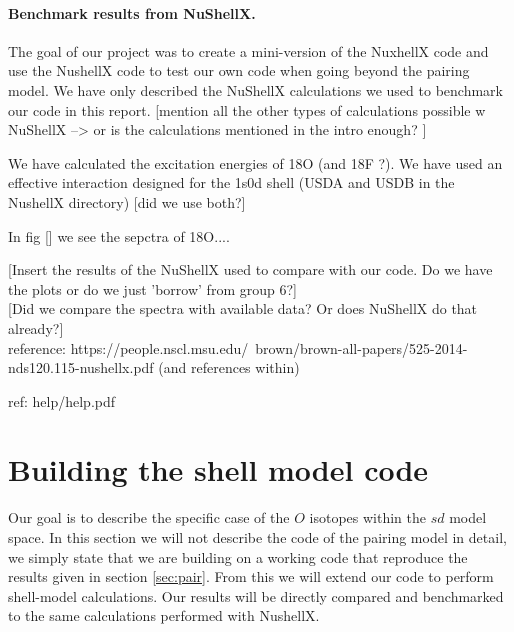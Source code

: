 \documentclass[twoside]{article}
\begin{document}
\paragraph{Benchmark results from NuShellX.} The goal of our project was to create a mini-version of the NuxhellX code and use the NushellX code to test our own code when going beyond the pairing model. We have only described the NuShellX calculations we used to benchmark our code in this report. [mention all the other types of calculations possible w NuShellX --> or is the calculations mentioned in the intro enough? ]

We have calculated the excitation energies of 18O (and 18F ?). We have used an effective interaction designed for the 1s0d shell (USDA and USDB in the NushellX directory) [did we use both?] 


In fig [] we see the sepctra of 18O....



[Insert the results of the NuShellX used to compare with our code. Do we have the plots or do we just 'borrow' from group 6?] \\

[Did we compare the spectra with available data? Or does NuShellX do that already?] \\











reference: https://people.nscl.msu.edu/~brown/brown-all-papers/525-2014-nds120.115-nushellx.pdf
(and references within)

ref: help/help.pdf









\section{Building the shell model code}

Our goal is to describe the specific case of the $O$ isotopes within the $sd$ model space. In this section we will not describe the code of the pairing model in detail, we simply state that we are building on a working code that reproduce the results given in section \ref{sec:pair}. From this we will extend our code to perform shell-model calculations. Our results will be directly compared and benchmarked to the same calculations performed with NushellX.
\end{document}
